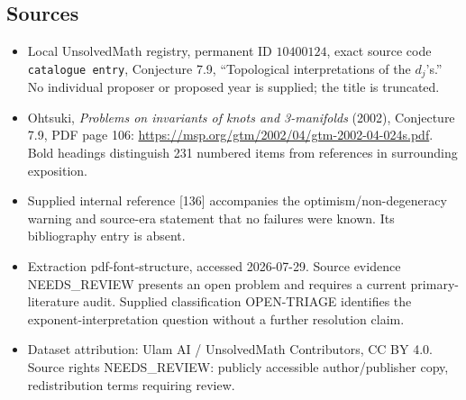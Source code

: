 \documentclass[11pt]{article}
\begin{document}
\subsection{Sources}
\begin{itemize}
\item Local UnsolvedMath registry, permanent ID \(10400124\), exact source code \texttt{catalogue entry}, Conjecture 7.9, ``Topological interpretations of the \(d_j\)'s.'' No individual proposer or proposed year is supplied; the title is truncated.
\item Ohtsuki, \emph{Problems on invariants of knots and 3-manifolds} (2002), Conjecture 7.9, PDF page 106: \url{https://msp.org/gtm/2002/04/gtm-2002-04-024s.pdf}. Bold headings distinguish 231 numbered items from references in surrounding exposition.
\item Supplied internal reference [136] accompanies the optimism/non-degeneracy warning and source-era statement that no failures were known. Its bibliography entry is absent.
\item Extraction pdf-font-structure, accessed 2026-07-29. Source evidence NEEDS\_REVIEW presents an open problem and requires a current primary-literature audit. Supplied classification OPEN-TRIAGE identifies the exponent-interpretation question without a further resolution claim.
\item Dataset attribution: Ulam AI / UnsolvedMath Contributors, CC BY 4.0. Source rights NEEDS\_REVIEW: publicly accessible author/publisher copy, redistribution terms requiring review.
\end{itemize}
\end{document}
